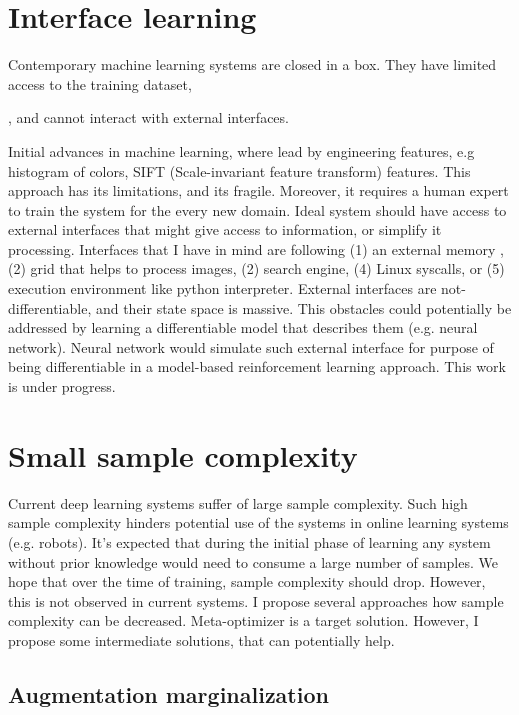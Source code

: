 \documentclass{article}
\begin{document}
\section{Interface learning}
\label{sec:interface}
Contemporary machine learning systems are closed in a box.
They have limited access to the training dataset, 

, and cannot 
interact with external interfaces.


Initial advances in machine learning, where lead by engineering features, 
e.g histogram of colors, SIFT (Scale-invariant feature transform) features. 
This approach has its limitations, and its fragile. Moreover, it requires a 
human expert to train the system for the every new domain. Ideal system should 
have access to external interfaces that might give access to information, or simplify it processing. 
Interfaces that I have in mind are following (1) an external memory \cite{weston2014memory, graves2014neural}, 
(2) grid that helps to process images, (2) search engine, 
(4) Linux syscalls, or (5) execution environment like python interpreter. External interfaces are not-differentiable, 
and their state space is massive. This obstacles could potentially be addressed by learning a differentiable 
model that describes them (e.g. neural network). Neural network would simulate such 
external interface for purpose of being differentiable in a model-based reinforcement learning approach. 
This work is under progress.

\section{Small sample complexity}
Current deep learning systems suffer of large sample complexity. Such 
high sample complexity hinders potential use of the systems in online 
learning systems (e.g. robots). It’s expected that during the initial phase of 
learning any system without prior knowledge would need to consume a large number of samples. 
We hope that over the time of training, sample complexity should drop. However, this is 
not observed in current systems. I propose several approaches how sample complexity can be decreased. 
Meta-optimizer is a target solution. However, I propose some intermediate solutions, that can potentially help.

\subsection{Augmentation marginalization}
\end{document}
